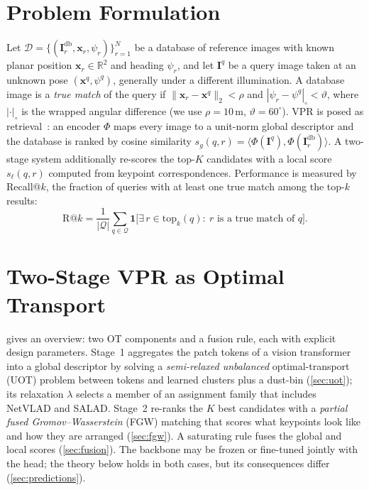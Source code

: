 \section{Problem Formulation}\label{sec:problem}
Let $\mathcal{D}=\{(\mathbf{I}^{\mathrm{db}}_r,\mathbf{x}_r,\psi_r)\}_{r=1}^{N}$ be a database of
reference images with known planar position $\mathbf{x}_r\in\mathbb{R}^2$ and heading $\psi_r$, and let
$\mathbf{I}^{q}$ be a query image taken at an unknown pose $(\mathbf{x}^q,\psi^q)$, generally under a
different illumination. A database image is a \emph{true match} of the query if
$\|\mathbf{x}_r-\mathbf{x}^q\|_2<\rho$ and $|\psi_r-\psi^q|_{\circ}<\vartheta$, where
$|\cdot|_\circ$ is the wrapped angular difference (we use $\rho=10$\,m, $\vartheta=60^\circ$).
VPR is posed as retrieval~\cite{lowry2015visual,schubert2023tutorial}: an encoder
$\Phi$ maps every image to a unit-norm global descriptor and the database is ranked by
cosine similarity $s_g(q,r)=\langle\Phi(\mathbf{I}^q),\Phi(\mathbf{I}^{\mathrm{db}}_r)\rangle$.
A two-stage system additionally re-scores the top-$K$ candidates with a local score
$s_\ell(q,r)$ computed from keypoint correspondences. Performance is measured by
Recall@$k$, the fraction of queries with at least one true match among the top-$k$ results:
\begin{equation}
\mathrm{R@}k=\frac{1}{|\mathcal{Q}|}\sum_{q\in\mathcal{Q}}\mathbf{1}\big[\exists\, r\in\mathrm{top}_k(q):\ r \text{ is a true match of } q\big].
\label{eq:recall}
\end{equation}

\section{Two-Stage VPR as Optimal Transport}\label{sec:method}
 gives an overview: two OT components and a fusion rule, each with explicit design
parameters. Stage~1 aggregates the patch tokens of a vision transformer into a global descriptor by
solving a \emph{semi-relaxed unbalanced} optimal-transport (UOT) problem between tokens and learned
clusters plus a dust-bin (\cref{sec:uot}); its relaxation $\lambda$ selects a member of an assignment
family that includes NetVLAD and SALAD. Stage~2 re-ranks the $K$ best candidates with a
\emph{partial fused Gromov--Wasserstein} (FGW) matching that scores what keypoints look like and how
they are arranged (\cref{sec:fgw}). A saturating rule fuses the global and local scores
(\cref{sec:fusion}). The backbone may be frozen or fine-tuned jointly with the head; the
theory below holds in both cases, but its consequences differ (\cref{sec:predictions}).

